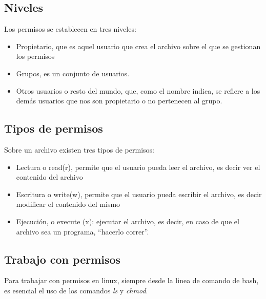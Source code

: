 \documentclass[12pt,a4paper]{article} %
\begin{document}
	\subsection{Niveles}
	Los permisos se establecen en tres niveles:
	\begin{itemize}
		\item Propietario, que es aquel usuario que crea el archivo sobre el que se gestionan los permisos
		\item Grupos, es un conjunto de usuarios.\par
		\item Otros usuarios o resto del mundo, que, como el nombre indica, se refiere a los demás usuarios que nos son propietario o no pertenecen al grupo.
	\end{itemize}
	\clearpage
	\subsection{Tipos de permisos}
	Sobre un archivo existen tres tipos de permisos:
	\begin{itemize}
		\item Lectura o read(r), permite que el usuario pueda leer el archivo, es decir ver el contenido del archivo
		\item Escritura o write(w), permite que el usuario pueda escribir el archivo, es decir modificar el contenido del mismo
		\item Ejecución, o execute (x): ejecutar el archivo, es decir, en caso de que el archivo sea un programa, “hacerlo correr”.\par 
	\end{itemize}
	\subsection{Trabajo con permisos}
	Para trabajar con permisos en linux, siempre desde la linea de comando de bash, es esencial el uso de los comandos \textit{ls} y \textit{chmod}.
\end{document}
